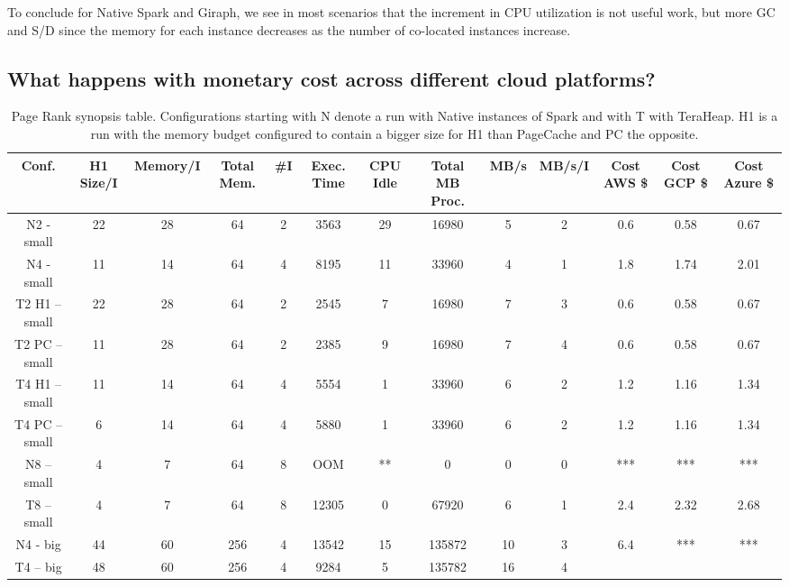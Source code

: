 To conclude for Native Spark and Giraph, we see in most scenarios that the increment in CPU utilization is not useful work, but more GC and S/D since the memory for each instance decreases as the number of co-located instances increase.

\subsection{What
happens with monetary cost across different cloud platforms?}

\iffalse
\begin{table}[htbp]
  \centering
	\begin{subtable}[b]{0.45\linewidth}
  \caption{Page Rank synopsis table. Configurations starting
    with N denote a run with Native instances of Spark and with T with
    TeraHeap. H1 is a run with the memory budget configured to contain
    a bigger size for H1 than PageCache and PC the opposite.}
  \label{tab:pr_table}
        \begin{tabular}{|c|c|c|c|c|c|c|c|c|c|c|c|c|}
      \hline
\textbf{Conf.} & \textbf{H1 Size/I} & \textbf{Memory/I} & \textbf{Total Mem.} & \textbf{\#I} & \textbf{Exec. Time} & \textbf{CPU Idle} & \textbf{Total MB Proc.} & \textbf{MB/s} & \textbf{MB/s/I} & \textbf{Cost AWS \$} & \textbf{Cost GCP \$} & \textbf{Cost Azure \$} \\
        \hline
    N2 - small & 22 & 28 & 64 & 2 & 3563 & 29 & 16980 & 5 & 2 & 0.6 & 0.58 & 0.67 \\
    N4 - small & 11 & 14 & 64 & 4 & 8195 & 11 & 33960 & 4 & 1 & 1.8 & 1.74 & 2.01 \\
    T2 H1 – small & 22 & 28 & 64 & 2 & 2545 & 7 & 16980 & 7 & 3 & 0.6 & 0.58 & 0.67 \\
    T2 PC – small & 11 & 28 & 64 & 2 & 2385 & 9 & 16980 & 7 & 4 & 0.6 & 0.58 & 0.67 \\
    T4 H1 – small & 11 & 14 & 64 & 4 & 5554 & 1 & 33960 & 6 & 2 & 1.2 & 1.16 & 1.34 \\
    T4 PC – small & 6 & 14 & 64 & 4 & 5880 & 1 & 33960 & 6 & 2 & 1.2 & 1.16 & 1.34 \\
    N8 – small & 4 & 7 & 64 & 8 & OOM & ** & 0 & 0 & 0 & *** & *** & *** \\
    T8 – small & 4 & 7 & 64 & 8 & 12305 & 0 & 67920 & 6 & 1 & 2.4 & 2.32 & 2.68 \\
    N4 - big & 44 & 60 & 256 & 4 & 13542 & 15 & 135872 & 10 & 3 & 6.4 & *** & *** \\
    T4 – big & 48 & 60 & 256 & 4 & 9284 & 5 & 135782 & 16 & 4 \\      
	\hline
     \end{tabular}%
\end{subtable}


\end{table}
